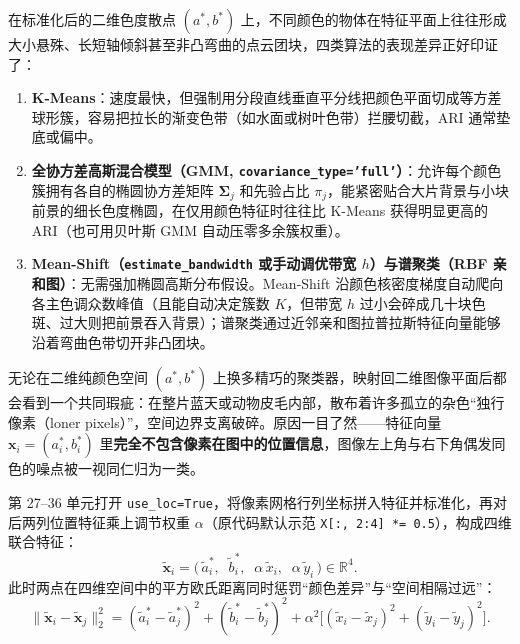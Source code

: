 
在标准化后的二维色度散点 $(a^*, b^*)$ 上，不同颜色的物体在特征平面上往往形成大小悬殊、长短轴倾斜甚至非凸弯曲的点云团块，四类算法的表现差异正好印证了：
\begin{enumerate}
\item \textbf{K-Means}：速度最快，但强制用分段直线垂直平分线把颜色平面切成等方差球形簇，容易把拉长的渐变色带（如水面或树叶色带）拦腰切截，ARI 通常垫底或偏中。
\item \textbf{全协方差高斯混合模型（GMM, \texttt{covariance\_type='full'}）}：允许每个颜色簇拥有各自的椭圆协方差矩阵 $\boldsymbol{\Sigma}_j$ 和先验占比 $\pi_j$，能紧密贴合大片背景与小块前景的细长色度椭圆，在仅用颜色特征时往往比 K-Means 获得明显更高的 ARI（也可用贝叶斯 GMM 自动压零多余簇权重）。
\item \textbf{Mean-Shift（\texttt{estimate\_bandwidth} 或手动调优带宽 $h$）与谱聚类（RBF 亲和图）}：无需强加椭圆高斯分布假设。Mean-Shift 沿颜色核密度梯度自动爬向各主色调众数峰值（且能自动决定簇数 $K$，但带宽 $h$ 过小会碎成几十块色斑、过大则把前景吞入背景）；谱聚类通过近邻亲和图拉普拉斯特征向量能够沿着弯曲色带切开非凸团块。
\end{enumerate}



无论在二维纯颜色空间 $(a^*, b^*)$ 上换多精巧的聚类器，映射回二维图像平面后都会看到一个共同瑕疵：在整片蓝天或动物皮毛内部，散布着许多孤立的杂色“独行像素（loner pixels）”，空间边界支离破碎。原因一目了然——特征向量 $\mathbf{x}_i = (a_i^*, b_i^*)$ 里\textbf{完全不包含像素在图中的位置信息}，图像左上角与右下角偶发同色的噪点被一视同仁归为一类。

第 27–36 单元打开 \texttt{use\_loc=True}，将像素网格行列坐标拼入特征并标准化，再对后两列位置特征乘上调节权重 $\alpha$（原代码默认示范 \texttt{X[:, 2:4] *= 0.5}），构成四维联合特征：
\[
\tilde{\mathbf{x}}_i = \bigl(\,\tilde{a}_i^*,\;\; \tilde{b}_i^*,\;\; \alpha\,\tilde{x}_i,\;\; \alpha\,\tilde{y}_i\,\bigr) \in \mathbb{R}^4.
\tag{T9.1}
\]
此时两点在四维空间中的平方欧氏距离同时惩罚“颜色差异”与“空间相隔过远”：
\[
\|\tilde{\mathbf{x}}_i - \tilde{\mathbf{x}}_j\|_2^2 = (\tilde{a}_i^* - \tilde{a}_j^*)^2 + (\tilde{b}_i^* - \tilde{b}_j^*)^2 + \alpha^2\bigl[(\tilde{x}_i - \tilde{x}_j)^2 + (\tilde{y}_i - \tilde{y}_j)^2\bigr].
\tag{T9.2}
\]

